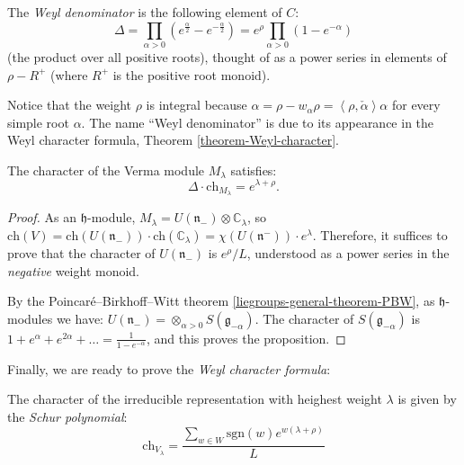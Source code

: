 \begin{definition}
 \label{definition-Weyl-denominator}
The {\it Weyl denominator} is the following element of $C$: 
$$\Delta = \prod_{\alpha>0} \left( e^\frac{\alpha}{2} - e^{-\frac{\alpha}{2}}\right) =  e^\rho \prod_{\alpha>0} \left( 1 - e^{-{\alpha}}\right)$$
(the product over all positive roots), thought of as a power series in elements of $\rho-R^+$ (where $R^+$ is the positive root monoid).
\end{definition}

Notice that the weight $\rho$ is integral because $\alpha = \rho- w_\alpha\rho = \left< \rho,\check\alpha\right> \alpha$ for every simple root $\alpha$. The name ``Weyl denominator'' is due to its appearance in the Weyl character formula, Theorem \ref{theorem-Weyl-character}.


\begin{proposition}
\label{proposition-character-Verma}
 The character of the Verma module $M_\lambda$ satisfies:
$$ \Delta \cdot \text{ch}_{M_\lambda} = e^{\lambda+\rho}.$$
\end{proposition}

\begin{proof}
 As an $\mathfrak h$-module, $M_\lambda = U(\mathfrak n_-) \otimes \mathbb C_\lambda$, so $\text{ch}(V) = \text{ch}(U(\mathfrak n_-))\cdot \text{ch}(\mathbb C_{\lambda}) = \chi(U(\mathfrak n^-))\cdot e^{\lambda}$. Therefore, it suffices to prove that the character of $U(\mathfrak n_-)$ is $e^\rho/L$, understood as a power series in the \emph{negative} weight monoid.

 By the Poincar\'e--Birkhoff--Witt theorem \ref{liegroups-general-theorem-PBW}, as $\mathfrak h$-modules we have: $U(\mathfrak n_-) = \otimes_{\alpha>0} S(\mathfrak g_{-\alpha})$. The character of $S(\mathfrak g_{-\alpha})$ is $1+e^{\alpha}+e^{2\alpha}+\dots = \frac{1}{1-e^{-\alpha}}$, and this proves the proposition.
\end{proof}

Finally, we are ready to prove the \emph{Weyl character formula}:

\begin{theorem}
\label{theorem-Weyl-character}
The character of the irreducible representation with heighest weight $\lambda$ is given by the \emph{Schur polynomial}:
$$ \text{ch}_{V_\lambda} = \frac{\sum_{w\in W} \text{sgn}(w) e^{w(\lambda+\rho)}}{L}$$
\end{theorem}

